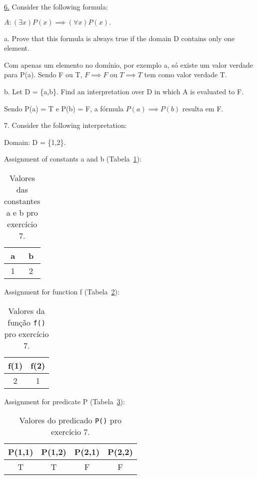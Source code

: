 \underline{6.} Consider the following formula:

$ A: (\exists x) P(x) \implies (\forall x) P(x). $

a. Prove that this formula is always true if the domain D contains only one element.

Com apenas um elemento no domínio, por exemplo a, só existe um valor verdade para P(a). Sendo F ou T, $ F \implies F $ ou $ T \implies T $ tem como valor verdade T.

b. Let D = \{a,b\}. Find an interpretation over D in which A is evaluated to F.

Sendo P(a) = T e P(b) = F, a fórmula $ P(a) \implies P(b) $ resulta em F.

7. Consider the following interpretation:

Domain: D = \{1,2\}.

Assignment of constants a and b (Tabela~\ref{tab:pergunta7a}):

\begin{table}
 \centering
 \begin{tabular}{cc}
  \hline
  a & b \\ \hline
  1 & 2 \\ \hline
 \end{tabular}
 \caption{Valores das constantes a e b pro exercício 7.}
 \label{tab:pergunta7a}
\end{table}

Assignment for function f (Tabela~\ref{tab:pergunta7b}):

\begin{table}
 \centering
 \begin{tabular}{cc}
  \hline
  f(1) & f(2) \\ \hline
  2 & 1 \\ \hline
 \end{tabular}
 \caption{Valores da função \texttt{f()} pro exercício 7.}
 \label{tab:pergunta7b}
\end{table}

Assignment for predicate P (Tabela~\ref{tab:pergunta7c}):

\begin{table}
 \centering
 \begin{tabular}{cccc}
  \hline
  P(1,1) & P(1,2) & P(2,1) & P(2,2) \\ \hline
  T & T & F & F \\ \hline
 \end{tabular}
 \caption{Valores do predicado \texttt{P()} pro exercício 7.}
 \label{tab:pergunta7c}
\end{table}

